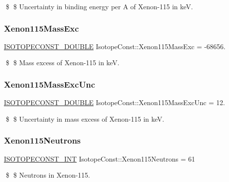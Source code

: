 \$ \$ Uncertainty in binding energy per A of Xenon-\/115 in keV. \mbox{\label{group___isotope_const-_xenon-_xe115_ga3df931cd1f0b37c7b0897185d8594af9}} 
\subsubsection{\texorpdfstring{Xenon115\+Mass\+Exc}{Xenon115MassExc}}
{\footnotesize\ttfamily \mbox{\hyperlink{group___isotope_const-_macros_ga8f45a7272ce02c0b4c65c44636ed719a}{I\+S\+O\+T\+O\+P\+E\+C\+O\+N\+S\+T\+\_\+\+D\+O\+U\+B\+LE}} Isotope\+Const\+::\+Xenon115\+Mass\+Exc = -\/68656.}

\$ \$ Mass excess of Xenon-\/115 in keV. \mbox{\label{group___isotope_const-_xenon-_xe115_gab0d2b79c7d2548d1fdd2216131ff8072}} 
\subsubsection{\texorpdfstring{Xenon115\+Mass\+Exc\+Unc}{Xenon115MassExcUnc}}
{\footnotesize\ttfamily \mbox{\hyperlink{group___isotope_const-_macros_ga8f45a7272ce02c0b4c65c44636ed719a}{I\+S\+O\+T\+O\+P\+E\+C\+O\+N\+S\+T\+\_\+\+D\+O\+U\+B\+LE}} Isotope\+Const\+::\+Xenon115\+Mass\+Exc\+Unc = 12.}

\$ \$ Uncertainty in mass excess of Xenon-\/115 in keV. \mbox{\label{group___isotope_const-_xenon-_xe115_ga1157cb9b195a8e8d5aa4dedfd1c3953c}} 
\subsubsection{\texorpdfstring{Xenon115\+Neutrons}{Xenon115Neutrons}}
{\footnotesize\ttfamily \mbox{\hyperlink{group___isotope_const-_macros_ga5f18360b3e99483a35c32d789e62621c}{I\+S\+O\+T\+O\+P\+E\+C\+O\+N\+S\+T\+\_\+\+I\+NT}} Isotope\+Const\+::\+Xenon115\+Neutrons = 61}

\$ \$ Neutrons in Xenon-\/115. \mbox{\label{group___isotope_const-_xenon-_xe115_ga5c8eeceba50994735fff2d5b11ed536f}} 
